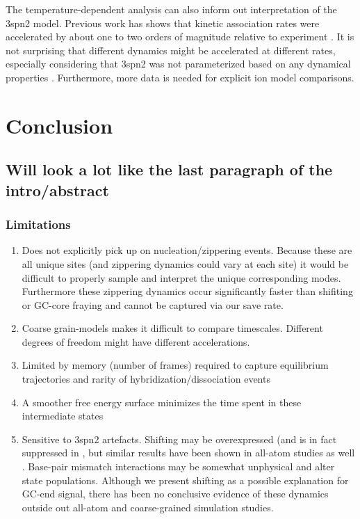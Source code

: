 \documentclass[journal=jpcbfk,manuscript=article]{achemso}
\begin{document}
The temperature-dependent analysis can also inform out interpretation of the 3spn2 model. Previous work has shows that kinetic association rates were accelerated by about one to two orders of magnitude relative to experiment \citep{Hinckley2013AnHybridization}.  It is not surprising that different dynamics might be accelerated at different rates, especially considering that 3spn2 was not parameterized based on any dynamical properties \citep{?}. Furthermore, more data is needed for explicit ion model comparisons.


\section{\label{sec:conc}Conclusion}
\subsection{\label{sec:Results}Will look a lot like the last paragraph of the intro/abstract}

\subsubsection{\label{sec:Results}Limitations} 

\begin{enumerate}
	\item Does not explicitly pick up on nucleation/zippering events. Because these are all unique sites (and zippering dynamics could vary at each site) it would be difficult to properly sample and interpret the unique corresponding modes. Furthermore these zippering dynamics occur significantly faster than shifiting or GC-core fraying and cannot be captured via our save rate. 
	\item Coarse grain-models makes it difficult to compare timescales. Different degrees of freedom might have different accelerations.
	\item Limited by memory (number of frames) required to capture equilibrium trajectories and rarity of hybridization/dissociation events
	\item A smoother free energy surface minimizes the time spent in these intermediate states
	\item Sensitive to 3spn2 artefacts. Shifting may be overexpressed (and is in fact suppressed in \citep{Romano2013DNADependence}, but similar results have been shown in all-atom studies as well \citep{Xiao2019}. Base-pair mismatch interactions may be somewhat unphysical and alter state populations. Although we present shifting as a possible explanation for GC-end signal, there has been no conclusive evidence of these dynamics outside out all-atom and coarse-grained simulation studies.
\end{enumerate}
\end{document}
